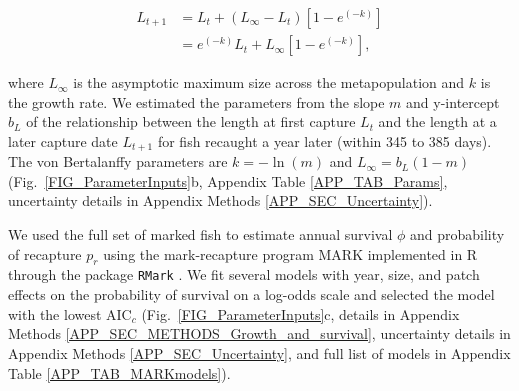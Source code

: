 \documentclass[12pt, oneside]{article}   	%
\begin{document}
\begin{equation} \label{EQN_VBL} 
\begin{split}
L_{t+1} & = L_t + (L_\infty - L_t)[1 - e^{(-k)}] \\
 & = e^{(-k)}L_t + L_\infty[1 - e^{(-k)}],
\end{split}
\end{equation}

where $L_\infty$ is the asymptotic maximum size across the metapopulation and $k$ is the growth rate. We estimated the parameters from the slope $m$ and y-intercept $b_L$ of the relationship between the length at first capture $L_t$ and the length at a later capture date $L_{t+1}$ for fish recaught a year later (within 345 to 385 days). The von Bertalanffy parameters are $k = -\ln(m)$ and $L_\infty = b_L(1-m)$ \citep{hart2009estimating} (Fig.\ \ref{FIG_ParameterInputs}b, Appendix Table \ref{APP_TAB_Params}, uncertainty details in Appendix Methods \ref{APP_SEC_Uncertainty}).


We used the full set of marked fish to estimate annual survival $\phi$ and probability of recapture $p_r$ using the mark-recapture program MARK implemented in R through the package \texttt{RMark} \citep{RMark_Laake2013}. We fit several models with year, size, and patch effects on the probability of survival on a log-odds scale and selected the model with the lowest $\text{AIC}_c$ (Fig.\ \ref{FIG_ParameterInputs}c, details in Appendix Methods \ref{APP_SEC_METHODS_Growth_and_survival}, uncertainty details in Appendix Methods \ref{APP_SEC_Uncertainty}, and full list of models in Appendix Table \ref{APP_TAB_MARKmodels}). %
\end{document}
